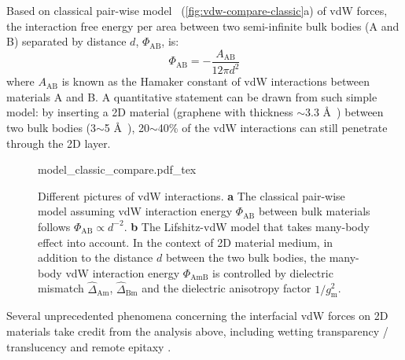 Based on classical pair-wise model~\cite{Hamaker_1937_vdW}
(\autoref{fig:vdw-compare-classic}a) of vdW forces, the interaction
free energy per area  between two semi-infinite
bulk bodies (A and B) separated by distance $d$, $\Phi_{\mathrm{AB}}$, is:
\begin{equation}
  \label{eq:vdw-hamaker-res}
  \Phi_{\mathrm{AB}} = - \frac{A_{\mathrm{AB}}}{12 \pi d^{2}}
\end{equation}
where $A_{\mathrm{AB}}$ is known as the Hamaker constant of vdW
interactions between materials A and B.
%
A quantitative statement can be drawn from such simple model: by
inserting a 2D material (\eg graphene with thickness $\sim{}$3.3
\AA{}~\cite{Shearer_2016}) between two bulk bodies (3$\sim{}$5
\AA{}~\cite{Israelachvili_2011_book}), 20$\sim{}$40\% of the vdW
interactions can still penetrate through the 2D layer.
\begin{figure}[!htbp]
  \centering
  {model_classic_compare.pdf_tex}
  \caption{\label{fig:vdw-compare-classic}%
    Different pictures of vdW interactions. {\bfseries a} The classical
    pair-wise model assuming vdW interaction energy
    $\Phi_{\mathrm{AB}}$ between bulk materials follows
    $\Phi_{\mathrm{AB}} \propto d^{-2}$. {\bfseries b} The Lifshitz-vdW
    model that takes many-body effect into account. In the context of
    2D material medium, in addition to the distance $d$ between the
    two bulk bodies, the many-body vdW interaction energy
    $\Phi_{\mathrm{AmB}}$ is controlled by dielectric mismatch
    $\hat{\Delta}_{\mathrm{Am}}$, $\hat{\Delta}_{\mathrm{Bm}}$ and the
    dielectric anisotropy factor $1/g_{\mathrm{m}}^{2}$.}
\end{figure}
%
Several unprecedented phenomena concerning the interfacial vdW forces
on 2D materials take credit from the analysis above, including wetting
transparency / translucency
\cite{Shih_2012_prl,rafiee_2012_transparency,Gurarslan_2016_screen_MoS2} and remote
epitaxy \cite{Kim_2017_remote_epi_Gr,Kong_2018_pol}.

